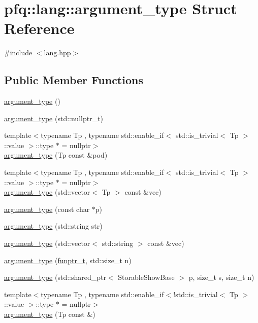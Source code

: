 \hypertarget{structpfq_1_1lang_1_1argument__type}{}\section{pfq\+:\+:lang\+:\+:argument\+\_\+type Struct Reference}
\label{structpfq_1_1lang_1_1argument__type}


{\ttfamily \#include $<$lang.\+hpp$>$}

\subsection*{Public Member Functions}
\begin{DoxyCompactItemize}
\item 
\hyperlink{structpfq_1_1lang_1_1argument__type_aa89bbfb7ed7487d09512e29bc8df723a}{argument\+\_\+type} ()
\item 
\hyperlink{structpfq_1_1lang_1_1argument__type_aaa36abcce4c5e2418fc5a10328619a2d}{argument\+\_\+type} (std\+::nullptr\+\_\+t)
\item 
{\footnotesize template$<$typename Tp , typename std\+::enable\+\_\+if$<$ std\+::is\+\_\+trivial$<$ Tp $>$\+::value $>$\+::type $\ast$  = nullptr$>$ }\\\hyperlink{structpfq_1_1lang_1_1argument__type_a1ed803face97c18de5b24a852174f160}{argument\+\_\+type} (Tp const \&pod)
\item 
{\footnotesize template$<$typename Tp , typename std\+::enable\+\_\+if$<$ std\+::is\+\_\+trivial$<$ Tp $>$\+::value $>$\+::type $\ast$  = nullptr$>$ }\\\hyperlink{structpfq_1_1lang_1_1argument__type_a214fc2f5dc718677454cde46788cef1d}{argument\+\_\+type} (std\+::vector$<$ Tp $>$ const \&vec)
\item 
\hyperlink{structpfq_1_1lang_1_1argument__type_a775f6b6bf458de21aef78e3b806ead9d}{argument\+\_\+type} (const char $\ast$p)
\item 
\hyperlink{structpfq_1_1lang_1_1argument__type_a568ea3646078a7ab97132cbff3805980}{argument\+\_\+type} (std\+::string str)
\item 
\hyperlink{structpfq_1_1lang_1_1argument__type_ae3ffe6217fd55abcccef156ac2b2f52f}{argument\+\_\+type} (std\+::vector$<$ std\+::string $>$ const \&vec)
\item 
\hyperlink{structpfq_1_1lang_1_1argument__type_a25b9c5fc803a86259615dd54e13a19e8}{argument\+\_\+type} (\hyperlink{structpfq_1_1lang_1_1funptr__t}{funptr\+\_\+t}, std\+::size\+\_\+t n)
\item 
\hyperlink{structpfq_1_1lang_1_1argument__type_a3586d8765421e7a9fc01ee5185be7f32}{argument\+\_\+type} (std\+::shared\+\_\+ptr$<$ Storable\+Show\+Base $>$ p, size\+\_\+t s, size\+\_\+t n)
\item 
{\footnotesize template$<$typename Tp , typename std\+::enable\+\_\+if$<$!std\+::is\+\_\+trivial$<$ Tp $>$\+::value $>$\+::type $\ast$  = nullptr$>$ }\\\hyperlink{structpfq_1_1lang_1_1argument__type_a4285751f800858bb96057e3ffd44dc77}{argument\+\_\+type} (Tp const \&)
\end{DoxyCompactItemize}
